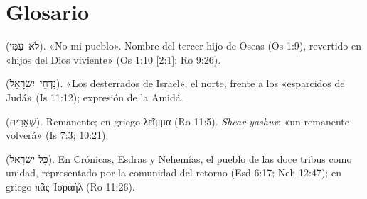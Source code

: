 \documentclass[11pt,letterpaper]{article}
\newcommand{\heb}[1]{\mbox{\foreignlanguage{hebrew}{#1}}}
\newcommand{\grc}[1]{\foreignlanguage{ancientgreek}{#1}}
\begin{document}
\section*{Glosario}
\begin{description}\small
\item[Lo-Ammí] (\heb{לֹא עַמִּי}). «No mi pueblo». Nombre del tercer hijo de Oseas (Os 1:9), revertido en «hijos del Dios viviente» (Os 1:10 [2:1]; Ro 9:26).
\item[Nidjé Yisrael] (\heb{נִדְחֵי יִשְׂרָאֵל}). «Los desterrados de Israel», el norte, frente a los «esparcidos de Judá» (Is 11:12); expresión de la Amidá.
\item[She'erit] (\heb{שְׁאֵרִית}). Remanente; en griego \grc{λεῖμμα} (Ro 11:5). \emph{Shear-yashuv}: «un remanente volverá» (Is 7:3; 10:21).
\item[Todo Israel] (\heb{כָּל־יִשְׂרָאֵל}). En Crónicas, Esdras y Nehemías, el pueblo de las doce tribus como unidad, representado por la comunidad del retorno (Esd 6:17; Neh 12:47); en griego \grc{πᾶς Ἰσραήλ} (Ro 11:26).
\end{description}
\end{document}
